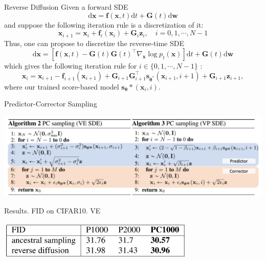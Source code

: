 \documentclass[xcolor=dvipsnames]{beamer}
\begin{document}
    \begin{frame}{Reverse Diffusion}
        Given a forward SDE
$$
\mathrm{d} \mathbf{x}=\mathbf{f}(\mathbf{x}, t) \mathrm{d} t+\mathbf{G}(t) \mathrm{d} \mathbf{w}
$$
and suppose the following iteration rule is a discretization of it:
$$
\mathbf{x}_{i+1}=\mathbf{x}_i+\mathbf{f}_i\left(\mathbf{x}_i\right)+\mathbf{G}_i \mathbf{z}_i, \quad i=0,1, \cdots, N-1
$$
Thus, one can propose to discretize the reverse-time SDE
$$
\mathrm{d} \mathbf{x}=\left[\mathbf{f}(\mathbf{x}, t)-\mathbf{G}(t) \mathbf{G}(t)^{\top} \nabla_{\mathbf{x}} \log p_t(\mathbf{x})\right] \mathrm{d} t+\mathbf{G}(t) \mathrm{d} \overline{\mathbf{w}}
$$
which gives the following iteration rule for $i \in\{0,1, \cdots, N-1\}$ :
$$
\mathbf{x}_i=\mathbf{x}_{i+1}-\mathbf{f}_{i+1}\left(\mathbf{x}_{i+1}\right)+\mathbf{G}_{i+1} \mathbf{G}_{i+1}^{\top} \mathbf{s}_{\boldsymbol{\theta}^*}\left(\mathbf{x}_{i+1}, i+1\right)+\mathbf{G}_{i+1} \mathbf{z}_{i+1},
$$
where our trained score-based model $\mathbf{s}_{\boldsymbol{\theta}} *\left(\mathbf{x}_i, i\right)$.
    \end{frame}

    \begin{frame}{Predictor-Corrector Sampling}
        \begin{center}
            \includegraphics[width=\textwidth]{pics/PC.png}
        \end{center}
    \end{frame}

    \begin{frame}{\hypertarget{frame:res-ve}{Results. FID on CIFAR10. VE}}            
        \begin{center}
            \includegraphics[width=0.7\textwidth]{pics/VE_table.png}
        \end{center}
    \end{frame}
\end{document}
